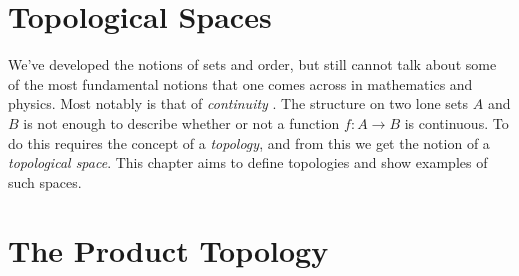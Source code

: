 \begingroup
    \ifcsname\PATH\endcsname
        \newcommand{\PATH}{books/Topology/Topological_Spaces}
        \newcommand{\OLDPATH}{\PATH}
    \else
        \newcommand{\OLDPATH}{\PATH}
        \renewcommand{\PATH}{books/Topology/Topological_Spaces}
    \fi
    \chapter{Topological Spaces}
        We've developed the notions of sets and order, but still cannot talk
        about some of the most fundamental notions that one comes across in
        mathematics and physics. Most notably is that of \textit{continuity}%
        . The structure on
        two lone sets $A$ and $B$ is not enough to describe whether or not a
        function $f:A\rightarrow{B}$ is continuous. To do this requires the
        concept of a \textit{topology}, and from this we get the
        notion of a \textit{topological space}. This
        chapter aims to define topologies and show examples of such spaces.
        
    \chapter{The Product Topology}
        
    \renewcommand{\PATH}{\OLDPATH}
\endgroup